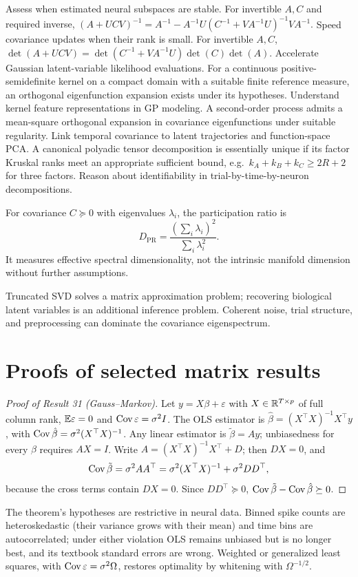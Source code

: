 {Assess when estimated neural subspaces are stable.}
{For invertible $A,C$ and required inverse,
$(A+UCV)^{-1}=A^{-1}-A^{-1}U(C^{-1}+VA^{-1}U)^{-1}VA^{-1}$.}
{Speed covariance updates when their rank is small.}
{For invertible $A,C$,
$\det(A+UCV)=\det(C^{-1}+VA^{-1}U)\det(C)\det(A)$.}
{Accelerate Gaussian latent-variable likelihood evaluations.}
{For a continuous positive-semidefinite kernel on a compact
domain with a suitable finite reference measure,
an orthogonal eigenfunction expansion exists under its hypotheses.}
{Understand kernel feature representations in GP modeling.}
{A second-order process admits a mean-square orthogonal expansion
in covariance eigenfunctions under suitable regularity.}
{Link temporal covariance to latent trajectories and function-space PCA.}
{A canonical polyadic tensor decomposition is essentially unique
if its factor Kruskal ranks meet an appropriate sufficient bound,
e.g.\ $k_A+k_B+k_C\geq 2R+2$ for three factors.}
{Reason about identifiability in trial-by-time-by-neuron decompositions.}

\begin{definition}
For covariance $C\succeq0$ with eigenvalues $\lambda_i$,
the participation ratio is
\[
D_{\mathrm{PR}}=\frac{(\sum_i\lambda_i)^2}{\sum_i\lambda_i^2}.
\]
It measures effective spectral dimensionality, not the intrinsic
manifold dimension without further assumptions.
\end{definition}
\begin{caution}
Truncated SVD solves a matrix approximation problem; recovering
biological latent variables is an additional inference problem.
Coherent noise, trial structure, and preprocessing can dominate
the covariance eigenspectrum.
\end{caution}
\section{Proofs of selected matrix results}
\begin{proof}[Proof of Result 31 (Gauss--Markov)]
Let $y=X\beta+\varepsilon$ with $X\in\mathbb{R}^{T\times p}$ of full column rank,
$\mathbb{E}\varepsilon=0$ and $\operatorname{Cov}\varepsilon=\sigma^2I$. The OLS estimator is
$\hat\beta=(X^\top X)^{-1}X^\top y$, with $\operatorname{Cov}\hat\beta=\sigma^2(X^\top X)^{-1}$.
Any linear estimator is $\tilde\beta=Ay$; unbiasedness for every $\beta$
requires $AX=I$. Write $A=(X^\top X)^{-1}X^\top+D$; then $DX=0$, and
\[
\operatorname{Cov}\tilde\beta=\sigma^2AA^\top=\sigma^2(X^\top X)^{-1}+\sigma^2DD^\top,
\]
because the cross terms contain $DX=0$. Since $DD^\top\succeq0$,
$\operatorname{Cov}\tilde\beta-\operatorname{Cov}\hat\beta\succeq0$.
\end{proof}
The theorem's hypotheses are restrictive in neural data. Binned spike
counts are heteroskedastic (their variance grows with their mean) and
time bins are autocorrelated; under either violation OLS remains
unbiased but is no longer best, and its textbook standard errors are wrong.
Weighted or generalized least squares, with $\operatorname{Cov}\varepsilon=\sigma^2\Omega$,
restores optimality by whitening with $\Omega^{-1/2}$.

